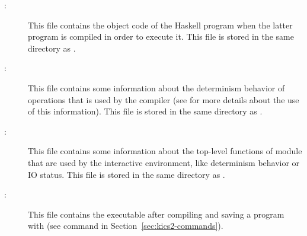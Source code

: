 \begin{description}
\item[:] This file contains the object code
of the Haskell program  when the latter program is
compiled in order to execute it.
This file is stored in the same directory as .

\item[:] This file contains some information about
the determinism behavior of operations that is used by the
\CYS compiler (see \cite{BrasselHanusPeemoellerReck11}
for more details about the use of this information).
This file is stored in the same directory as .

\item[:] This file contains some
information about the top-level functions of module 
that are used by the interactive environment,
like determinism behavior or IO status.
This file is stored in the same directory as .

\item[:] This file contains the executable
after compiling and saving a program with \CYS
(see command  in Section~\ref{sec:kics2-commands}).

\end{description}

